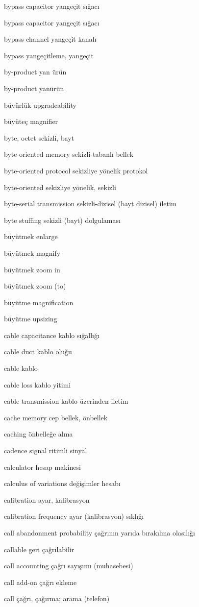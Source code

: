 \documentclass[12pt,fleqn]{article}\usepackage{../../common}
\begin{document}
bypass capacitor yangeçit sığacı

bypass capacitor yangeçit sığacı

bypass channel yangeçit kanalı

bypass yangeçitleme, yangeçit

by-product yan ürün

by-product yanürün

büyürlük upgradeability

büyüteç magnifier

byte, octet sekizli, bayt

byte-oriented memory sekizli-tabanlı bellek

byte-oriented protocol sekizliye yönelik protokol

byte-oriented sekizliye yönelik, sekizli

byte-serial transmission sekizli-dizisel (bayt dizisel) iletim

byte stuffing sekizli (bayt) dolgulaması

büyütmek enlarge

büyütmek magnify

büyütmek zoom in

büyütmek zoom (to)

büyütme magnification

büyütme upsizing

cable capacitance kablo sığallığı

cable duct kablo oluğu

cable kablo

cable loss kablo yitimi

cable transmission kablo üzerinden iletim

cache memory cep bellek, önbellek

caching önbelleğe alma

cadence signal ritimli sinyal

calculator hesap makinesi

calculus of variations değişimler hesabı

calibration ayar, kalibrasyon

calibration frequency ayar (kalibrasyon) sıklığı

call abandonment probability çağrının yarıda bırakılma olasılığı

callable geri çağrılabilir

call accounting çağrı sayışımı (muhasebesi)

call add-on çağrı ekleme

call çağrı, çağırma; arama (telefon)
\end{document}
